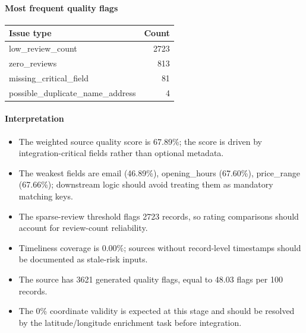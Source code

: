 \paragraph{Most frequent quality flags}
\begin{tabular}{lr}
\toprule
Issue type & Count \\
\midrule
low\_review\_count & 2723 \\
zero\_reviews & 813 \\
missing\_critical\_field & 81 \\
possible\_duplicate\_name\_address & 4 \\
\bottomrule
\end{tabular}

\paragraph{Interpretation}
\begin{itemize}
\item The weighted source quality score is 67.89\%; the score is driven by integration-critical fields rather than optional metadata.
\item The weakest fields are email (46.89\%), opening\_hours (67.60\%), price\_range (67.66\%); downstream logic should avoid treating them as mandatory matching keys.
\item The sparse-review threshold flags 2723 records, so rating comparisons should account for review-count reliability.
\item Timeliness coverage is 0.00\%; sources without record-level timestamps should be documented as stale-risk inputs.
\item The source has 3621 generated quality flags, equal to 48.03 flags per 100 records.
\item The 0\% coordinate validity is expected at this stage and should be resolved by the latitude/longitude enrichment task before integration.
\end{itemize}
